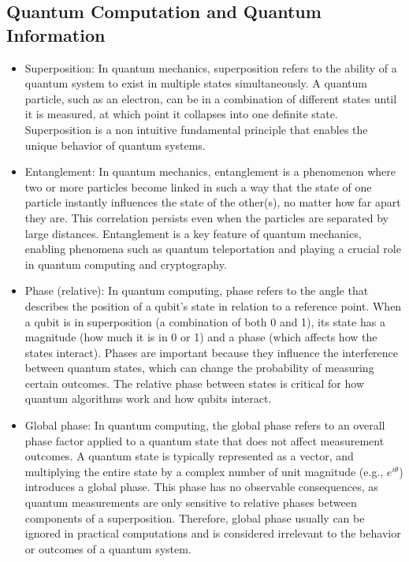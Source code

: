 \documentclass{article}
\begin{document}
	\subsection{Quantum Computation and Quantum Information}
		\begin{itemize}
			\item Superposition: In quantum mechanics, superposition refers to the ability of a quantum system to exist in multiple states simultaneously. A quantum particle, such as an electron, can be in a combination of different states until it is measured, at which point it collapses into one definite state. Superposition is a non intuitive fundamental principle that enables the unique behavior of quantum systems.
			
			\item Entanglement: In quantum mechanics, entanglement is a phenomenon where two or more particles become linked in such a way that the state of one particle instantly influences the state of the other(s), no matter how far apart they are. This correlation persists even when the particles are separated by large distances. Entanglement is a key feature of quantum mechanics, enabling phenomena such as quantum teleportation and playing a crucial role in quantum computing and cryptography.
			
			\item Phase (relative): In quantum computing, phase refers to the angle that describes the position of a qubit's state in relation to a reference point. When a qubit is in superposition (a combination of both 0 and 1), its state has a magnitude (how much it is in 0 or 1) and a phase (which affects how the states interact). Phases are important because they influence the interference between quantum states, which can change the probability of measuring certain outcomes. The relative phase between states is critical for how quantum algorithms work and how qubits interact.
			
			\item Global phase: In quantum computing, the global phase refers to an overall phase factor applied to a quantum state that does not affect measurement outcomes. A quantum state is typically represented as a vector, and multiplying the entire state by a complex number of unit magnitude (e.g., $e^{i\theta}$) introduces a global phase. This phase has no observable consequences, as quantum measurements are only sensitive to relative phases between components of a superposition. Therefore, global phase usually can be ignored in practical computations and is considered irrelevant to the behavior or outcomes of a quantum system.
			

\end{itemize}
\end{document}
